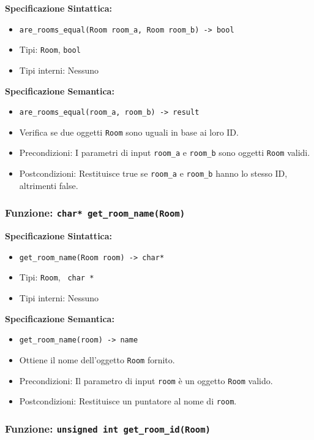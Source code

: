 \documentclass[11pt]{scrartcl} %
\begin{document}
\textbf{Specificazione Sintattica:}
\begin{itemize}
	\item \texttt{are\_rooms\_equal(Room room\_a, Room room\_b) -> bool}
	\item Tipi: \texttt{Room}, \texttt{bool}
	\item Tipi interni: Nessuno
\end{itemize}

\textbf{Specificazione Semantica:}
\begin{itemize}
	\item \texttt{are\_rooms\_equal(room\_a, room\_b) -> result}
	\item Verifica se due oggetti \texttt{Room} sono uguali in base ai loro ID.
	\item Precondizioni: I parametri di input \texttt{room\_a} e \texttt{room\_b} sono oggetti \texttt{Room} validi.
	\item Postcondizioni: Restituisce true se \texttt{room\_a} e \texttt{room\_b} hanno lo stesso ID, altrimenti false.
\end{itemize}

\subsubsection{Funzione: \texttt{char* get\_room\_name(Room)}}

\textbf{Specificazione Sintattica:}
\begin{itemize}
	\item \texttt{get\_room\_name(Room room) ->  char*}
	\item Tipi: \texttt{Room}, \texttt{ char *}
	\item Tipi interni: Nessuno
\end{itemize}

\textbf{Specificazione Semantica:}
\begin{itemize}
	\item \texttt{get\_room\_name(room) -> name}
	\item Ottiene il nome dell'oggetto \texttt{Room} fornito.
	\item Precondizioni: Il parametro di input \texttt{room} è un oggetto \texttt{Room} valido.
	\item Postcondizioni: Restituisce un puntatore al nome di \texttt{room}.
\end{itemize}

\subsubsection{Funzione: \texttt{unsigned int get\_room\_id(Room)}}
\end{document}

